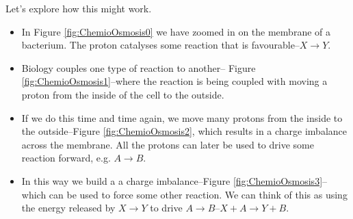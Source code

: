 \documentclass[]{article}
\begin{document}
Let's explore how this might work. 

\begin{itemize}
	\item In Figure \ref{fig:ChemioOsmosis0} we have zoomed in on the membrane of a bacterium. The proton catalyses some reaction that is favourable--$X\rightarrow Y$.

	\item Biology couples one type of reaction to another-- Figure \ref{fig:ChemioOsmosis1}--where the reaction is being coupled with moving a proton from the inside of the cell to the outside.

	\item If we do this time and time again, we move many protons from the inside to the outside--Figure \ref{fig:ChemioOsmosis2}, which results in a charge imbalance across the membrane. All the protons can later be used to drive some reaction forward, e.g. $A \rightarrow B$.
	
	\item In this way we build a a charge imbalance--Figure \ref{fig:ChemioOsmosis3}--which can be used to force some other reaction. We can think of this as using the energy released by $X\rightarrow Y$ to drive $A\rightarrow B$--$X+A\rightarrow Y+B$.

\end{itemize}
\end{document}
